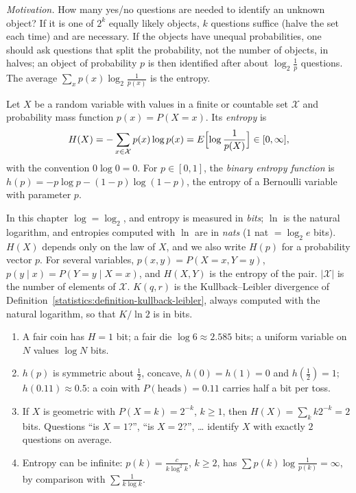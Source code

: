 \emph{Motivation.} How many yes/no questions are needed to identify an unknown object? If it is one of $2^k$ equally likely objects, $k$ questions suffice (halve the set each time) and are necessary. If the objects have
unequal probabilities, one should ask questions that split the probability, not the number of objects, in halves; an object of probability $p$ is then identified after about $\log_2\frac1p$ questions. The average
$\sum_xp(x)\log_2\frac{1}{p(x)}$ is the entropy.

\begin{definition}\label{information-theory:definition-entropy}
Let $X$ be a random variable with values in a finite or countable set $\mathcal{X}$ and probability mass function $p(x) = P(X = x)$. Its \emph{entropy} is
\[
H(X) = -\sum_{x \in \mathcal{X}}p(x)\log p(x) = E\Bigl[\log\frac{1}{p(X)}\Bigr] \in [0, \infty],
\]
with the convention $0\log 0 = 0$. For $p \in [0, 1]$, the \emph{binary entropy function} is $h(p) = -p\log p - (1 - p)\log(1 - p)$, the entropy of a Bernoulli variable with parameter $p$.
\end{definition}

\begin{notation}\label{information-theory:notation-log}
In this chapter $\log = \log_2$, and entropy is measured in \emph{bits}; $\ln$ is the natural logarithm, and entropies computed with $\ln$ are in \emph{nats} ($1$ nat $= \log_2e$ bits). $H(X)$ depends only on the law of
$X$, and we also write $H(p)$ for a probability vector $p$. For several variables, $p(x, y) = P(X = x, Y = y)$, $p(y \mid x) = P(Y = y \mid X = x)$, and $H(X, Y)$ is the entropy of the pair. $|\mathcal{X}|$ is the number of elements of
$\mathcal{X}$. $K(q, r)$ is the Kullback--Leibler divergence of Definition~\ref{statistics:definition-kullback-leibler}, always computed with the natural logarithm, so that $K/\ln 2$ is in bits.
\end{notation}

\begin{example}\label{information-theory:example-entropy}
\begin{enumerate}
\item A fair coin has $H = 1$ bit; a fair die $\log 6 \approx 2.585$ bits; a uniform variable on $N$ values $\log N$ bits.
\item $h(p)$ is symmetric about $\frac12$, concave, $h(0) = h(1) = 0$ and $h(\frac12) = 1$; $h(0.11) \approx 0.5$: a coin with $P(\text{heads}) = 0.11$ carries half a bit per toss.
\item If $X$ is geometric with $P(X = k) = 2^{-k}$, $k \geq 1$, then $H(X) = \sum_kk2^{-k} = 2$ bits. Questions ``is $X = 1$?'', ``is $X = 2$?'', \ldots{} identify $X$ with exactly $2$ questions on average.
\item Entropy can be infinite: $p(k) = \frac{c}{k\log^2k}$, $k \geq 2$, has $\sum p(k)\log\frac{1}{p(k)} = \infty$, by comparison with $\sum\frac{1}{k\log k}$.
\end{enumerate}
\end{example}

